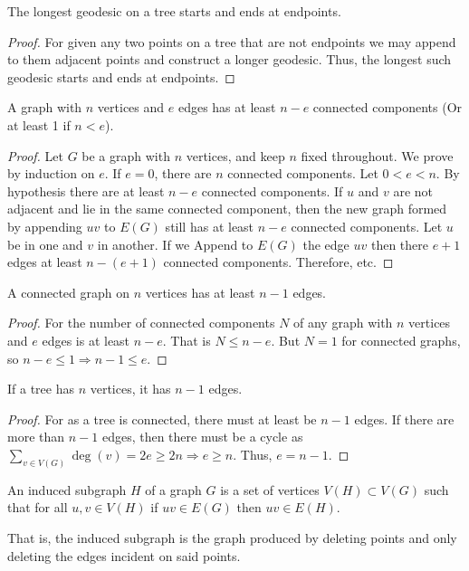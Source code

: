 \documentclass[crop=false,class=book]{standalone}
\begin{document}
\begin{corollary}
The longest geodesic on a tree starts and ends at endpoints.
\end{corollary}
\begin{proof}
For given any two points on a tree that are not endpoints we may append to them adjacent points and construct a longer geodesic. Thus, the longest such geodesic starts and ends at endpoints.
\end{proof}
\begin{lemma}
A graph with $n$ vertices and $e$ edges has at least $n-e$ connected components (Or at least 1 if $n<e$).
\end{lemma}
\begin{proof}
Let $G$ be a graph with $n$ vertices, and keep $n$ fixed throughout. We prove by induction on $e$. If $e=0$, there are $n$ connected components. Let $0<e < n$. By hypothesis there are at least $n-e$ connected components. If $u$ and $v$ are not adjacent and lie in the same connected component, then the new graph formed by appending $uv$ to $E(G)$ still has at least $n-e$ connected components. Let $u$ be in one and $v$ in another. If we Append to $E(G)$ the edge $uv$ then there $e+1$ edges at least $n-(e+1)$ connected components. Therefore, etc.
\end{proof}
\begin{corollary}
A connected graph on $n$ vertices has at least $n-1$ edges.
\end{corollary}
\begin{proof}
For the number of connected components $N$ of any graph with $n$ vertices and $e$ edges is at least $n-e$. That is $N\leq n-e$. But $N=1$ for connected graphs, so $n-e\leq 1 \Rightarrow n-1\leq e$.
\end{proof}
\begin{theorem}
If a tree has $n$ vertices, it has $n-1$ edges.
\end{theorem}
\begin{proof} For as a tree is connected, there must at least be $n-1$ edges. If there are more than $n-1$ edges, then there must be a cycle as $\sum_{v\in V(G)} \deg(v) = 2e \geq 2n\Rightarrow e\geq n$. Thus, $e=n-1$. 
\end{proof}
\begin{definition}
An induced subgraph $H$ of a graph $G$ is a set of vertices $V(H) \subset V(G)$ such that for all $u,v\in V(H)$ if $uv\in E(G)$ then $uv \in E(H)$.
\end{definition}
\begin{remark}
That is, the induced subgraph is the graph produced by deleting points and only deleting the edges incident on said points.
\end{remark}
\end{document}
